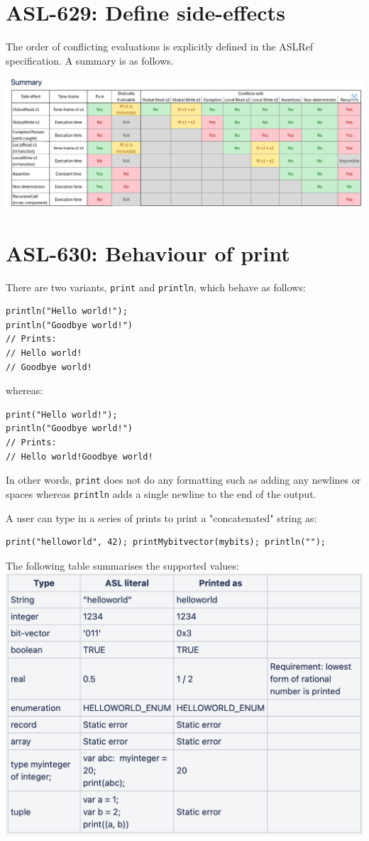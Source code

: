 \section{ASL-629: Define side-effects}

The order of conflicting evaluations is explicitly defined in the ASLRef
specification. A summary is as follows.

\includegraphics[width=\textwidth]{sideeffects.png}

\section{ASL-630: Behaviour of print}
There are two variants, \texttt{print} and \texttt{println}, which behave
as follows:
\begin{verbatim}
println("Hello world!");
println("Goodbye world!")
// Prints:
// Hello world!
// Goodbye world!
\end{verbatim}
whereas:
\begin{verbatim}
print("Hello world!");
println("Goodbye world!")
// Prints:
// Hello world!Goodbye world!
\end{verbatim}
In other words, \texttt{print} does not do any formatting such as adding any
newlines or spaces whereas \texttt{println} adds a single newline to the end of
the output.

A user can type in a series of prints to print a "concatenated" string as:
\begin{verbatim}
print("helloworld", 42); printMybitvector(mybits); println("");
\end{verbatim}

The following table summarises the supported values:\\
\includegraphics[width=\textwidth]{print.png}


